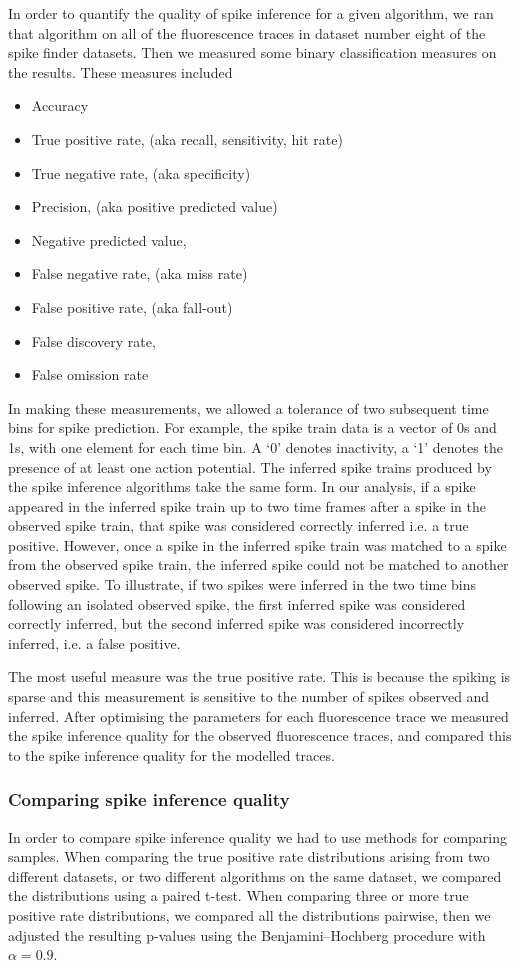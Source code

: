 \documentclass[a4paper,12pt]{article}
\theoremstyle{definition}
\begin{document}
In order to quantify the quality of spike inference for a given algorithm, we ran that algorithm on all of the fluorescence traces in dataset number eight of the spike finder datasets. Then we measured some binary classification measures on the results. These measures included
\begin{itemize}
  \item Accuracy
  \item True positive rate, (aka recall, sensitivity, hit rate)
  \item True negative rate, (aka specificity)
  \item Precision, (aka positive predicted value)
  \item Negative predicted value,
  \item False negative rate, (aka miss rate)
  \item False positive rate, (aka fall-out)
  \item False discovery rate,
  \item False omission rate
\end{itemize}
In making these measurements, we allowed a tolerance of two subsequent time bins for spike prediction. For example, the spike train data is a vector of 0s and 1s, with one element for each time bin. A `0' denotes inactivity, a `1' denotes the presence of at least one action potential. The inferred spike trains produced by the spike inference algorithms take the same form. In our analysis, if a spike appeared in the inferred spike train up to two time frames after a spike in the observed spike train, that spike was considered correctly inferred i.e. a true positive. However, once a spike in the inferred spike train was matched to a spike from the observed spike train, the inferred spike could not be matched to another observed spike. To illustrate, if two spikes were inferred in the two time bins following an isolated observed spike, the first inferred spike was considered correctly inferred, but the second inferred spike was considered incorrectly inferred, i.e. a false positive.

The most useful measure was the true positive rate. This is because the spiking is sparse and this measurement is sensitive to the number of spikes observed and inferred. After optimising the parameters for each fluorescence trace we measured the spike inference quality for the observed fluorescence traces, and compared this to the spike inference quality for the modelled traces.

\subsubsection{Comparing spike inference quality}\label{sec:comparing_spike_inference_quality}
In order to compare spike inference quality we had to use methods for comparing samples. When comparing the true positive rate distributions arising from two different datasets, or two different algorithms on the same dataset, we compared the distributions using a paired t-test. When comparing three or more true positive rate distributions, we compared all the distributions pairwise, then we adjusted the resulting p-values using the Benjamini–Hochberg procedure with $\alpha = 0.9$.
\end{document}
